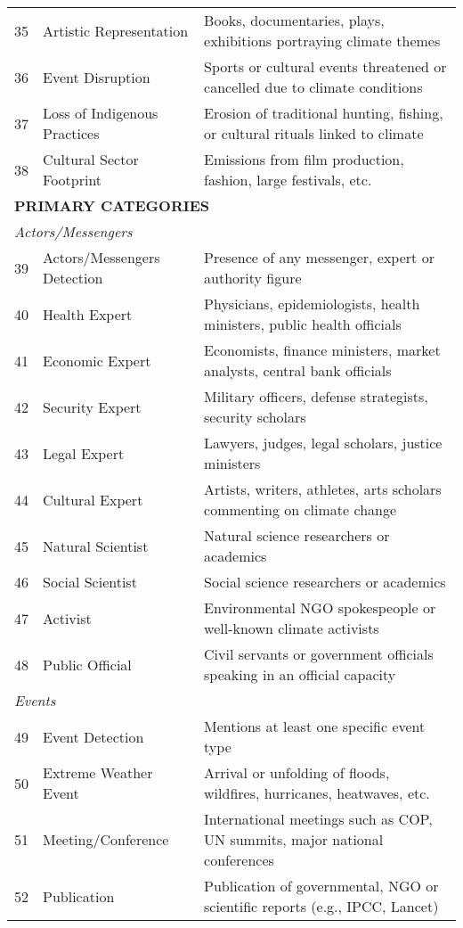 \documentclass[12pt]{article}
\begin{document}
{\begin{longtable}{p{0.5cm}p{5cm}p{16cm}}
35 & Artistic Representation & Books, documentaries, plays, exhibitions portraying climate themes \\
36 & Event Disruption & Sports or cultural events threatened or cancelled due to climate conditions \\
37 & Loss of Indigenous Practices & Erosion of traditional hunting, fishing, or cultural rituals linked to climate \\
38 & Cultural Sector Footprint & Emissions from film production, fashion, large festivals, etc. \\
\midrule
\multicolumn{3}{l}{\cellcolor{gray!10}\textbf{PRIMARY CATEGORIES}} \\
\midrule
\multicolumn{3}{l}{\textit{Actors/Messengers}} \\
39 & Actors/Messengers Detection & Presence of any messenger, expert or authority figure \\
40 & Health Expert & Physicians, epidemiologists, health ministers, public health officials \\
41 & Economic Expert & Economists, finance ministers, market analysts, central bank officials \\
42 & Security Expert & Military officers, defense strategists, security scholars \\
43 & Legal Expert & Lawyers, judges, legal scholars, justice ministers \\
44 & Cultural Expert & Artists, writers, athletes, arts scholars commenting on climate change \\
45 & Natural Scientist & Natural science researchers or academics \\
46 & Social Scientist & Social science researchers or academics \\
47 & Activist & Environmental NGO spokespeople or well-known climate activists \\
48 & Public Official & Civil servants or government officials speaking in an official capacity \\
\midrule
\multicolumn{3}{l}{\textit{Events}} \\
49 & Event Detection & Mentions at least one specific event type \\
50 & Extreme Weather Event & Arrival or unfolding of floods, wildfires, hurricanes, heatwaves, etc. \\
51 & Meeting/Conference & International meetings such as COP, UN summits, major national conferences \\
52 & Publication & Publication of governmental, NGO or scientific reports (e.g., IPCC, Lancet) \\

\end{longtable}}
\end{document}
